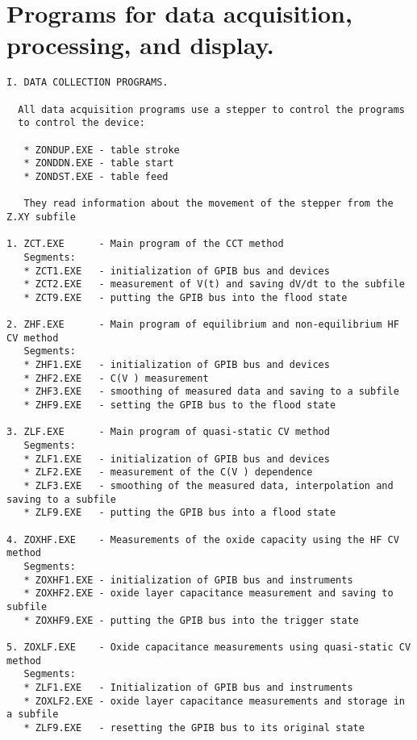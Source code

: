 
\chapter{Programs for data acquisition, processing, and display.}\label{app:AppendixH}

\begin{verbatim}
I. DATA COLLECTION PROGRAMS.

  All data acquisition programs use a stepper to control the programs
  to control the device:

   * ZONDUP.EXE - table stroke
   * ZONDDN.EXE - table start
   * ZONDST.EXE - table feed

   They read information about the movement of the stepper from the Z.XY subfile

1. ZCT.EXE      - Main program of the CCT method
   Segments:
   * ZCT1.EXE   - initialization of GPIB bus and devices
   * ZCT2.EXE   - measurement of V(t) and saving dV/dt to the subfile
   * ZCT9.EXE   - putting the GPIB bus into the flood state

2. ZHF.EXE      - Main program of equilibrium and non-equilibrium HF CV method
   Segments:
   * ZHF1.EXE   - initialization of GPIB bus and devices
   * ZHF2.EXE   - C(V ) measurement
   * ZHF3.EXE   - smoothing of measured data and saving to a subfile
   * ZHF9.EXE   - setting the GPIB bus to the flood state

3. ZLF.EXE      - Main program of quasi-static CV method
   Segments:
   * ZLF1.EXE   - initialization of GPIB bus and devices
   * ZLF2.EXE   - measurement of the C(V ) dependence
   * ZLF3.EXE   - smoothing of the measured data, interpolation and saving to a subfile
   * ZLF9.EXE   - putting the GPIB bus into a flood state

4. ZOXHF.EXE    - Measurements of the oxide capacity using the HF CV method
   Segments:
   * ZOXHF1.EXE - initialization of GPIB bus and instruments
   * ZOXHF2.EXE - oxide layer capacitance measurement and saving to subfile
   * ZOXHF9.EXE - putting the GPIB bus into the trigger state

5. ZOXLF.EXE    - Oxide capacitance measurements using quasi-static CV method
   Segments:
   * ZLF1.EXE   - Initialization of GPIB bus and instruments
   * ZOXLF2.EXE - oxide layer capacitance measurements and storage in a subfile
   * ZLF9.EXE   - resetting the GPIB bus to its original state



\end{verbatim}
